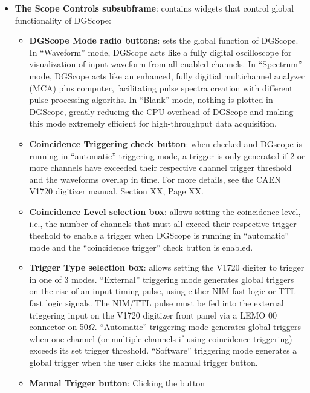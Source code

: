 \begin{itemize}
{  }
  \item{\textbf{The Scope Controls subsubframe}: contains widgets that
    control global functionality of DGScope:
    \begin{itemize}
      \item{\textbf{DGScope Mode radio buttons}: sets the global
        function of DGScope. In ``Waveform'' mode, DGScope acts like a
        fully digital oscilloscope for visualization of input waveform
        from all enabled channels. In ``Spectrum'' mode, DGScope acts
        like an enhanced, fully digitial multichannel analyzer (MCA)
        plus computer, facilitating pulse spectra creation with
        different pulse processing algoriths. In ``Blank'' mode,
        nothing is plotted in DGScope, greatly reducing the CPU
        overhead of DGScope and making this mode extremely efficient
        for high-throughput data acquisition.}
      \item{\textbf{Coincidence Triggering check button}: when checked
        and DGscope is running in ``automatic'' triggering mode, a
        trigger is only generated if 2 or more channels have exceeded
        their respective channel trigger threshold and the waveforms
        overlap in time. For more details, see the CAEN V1720
        digitizer manual, Section XX, Page XX.}
      \item{\textbf{Coincidence Level selection box}: allows setting
        the coincidence level, i.e., the number of channels that must
        all exceed their respective trigger theshold to enable a
        trigger when DGScope is running in ``automatic'' mode and the
        ``coincidence trigger'' check button is enabled.}
      \item{\textbf{Trigger Type selection box}: allows setting the
        V1720 digiter to trigger in one of 3 modes. ``External''
        triggering mode generates global triggers on the rise of an
        input timing pulse, using either NIM fast logic or TTL fast
        logic signals. The NIM/TTL pulse must be fed into the external
        triggering input on the V1720 digitizer front panel via a LEMO
        00 connector on 50$\Omega$. ``Automatic'' triggering mode
        generates global triggers when one channel (or multiple
        channels if using coincidence triggering) exceeds its set
        trigger threshold. ``Software'' triggering mode generates a
        global trigger when the user clicks the manual trigger
        button.}
      \item{\textbf{Manual Trigger button}: Clicking the button
}
\end{itemize}}
\end{itemize}
